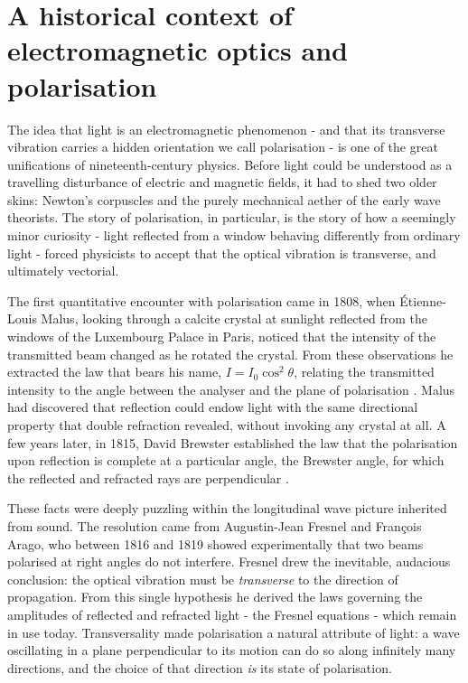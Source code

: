 \section{A historical context of electromagnetic optics and polarisation}

    The idea that light is an electromagnetic phenomenon - and that its transverse vibration
    carries a hidden orientation we call polarisation - is one of the great unifications of
    nineteenth-century physics. Before light could be understood as a travelling disturbance of
    electric and magnetic fields, it had to shed two older skins: Newton's corpuscles and the
    purely mechanical aether of the early wave theorists. The story of polarisation, in
    particular, is the story of how a seemingly minor curiosity - light reflected from a
    window behaving differently from ordinary light - forced physicists to accept that the
    optical vibration is transverse, and ultimately vectorial.

    The first quantitative encounter with polarisation came in 1808, when Étienne-Louis Malus,
    looking through a calcite crystal at sunlight reflected from the windows of the Luxembourg
    Palace in Paris, noticed that the intensity of the transmitted beam changed as he rotated
    the crystal. From these observations he extracted the law that bears his name, $I =
    I_0\cos^2\theta$, relating the transmitted intensity to the angle between the analyser and
    the plane of polarisation \cite{malus1809theorie}. Malus had discovered that reflection
    could endow light with the same directional property that double refraction revealed,
    without invoking any crystal at all. A few years later, in 1815, David Brewster
    established the law that the polarisation upon reflection is complete at a particular angle,
    the Brewster angle, for which the reflected and refracted rays are perpendicular
    \cite{brewster1815laws}.

    These facts were deeply puzzling within the longitudinal wave picture inherited from sound.
    The resolution came from Augustin-Jean Fresnel and François Arago, who between 1816 and 1819
    showed experimentally that two beams polarised at right angles do not interfere. Fresnel
    drew the inevitable, audacious conclusion: the optical vibration must be \emph{transverse}
    to the direction of propagation. From this single hypothesis he derived the laws governing
    the amplitudes of reflected and refracted light - the Fresnel equations - which remain
    in use today. Transversality made polarisation a natural attribute of light: a wave
    oscillating in a plane perpendicular to its motion can do so along infinitely many
    directions, and the choice of that direction \emph{is} its state of polarisation.

